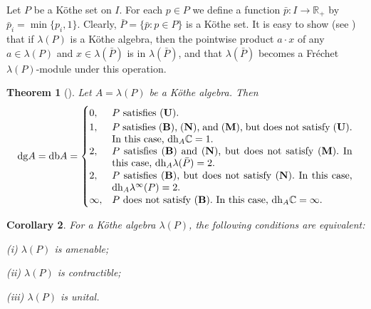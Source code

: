 \documentclass[12pt,reqno]{amsart}
\newtheorem{theorem}{Theorem}[section]
\newtheorem{corollary}[theorem]{Corollary}
\theoremstyle{definition}
\begin{document}
Let $P$ be a K\"othe set on $I$. For each $p\in P$ we define a function
$\bar p\colon I\to{\mathbb R}_+$
by $\bar p_i=\min\{ p_i,1\}$. Clearly, $\bar P=\{ \bar p : p\in P\}$ is a K\"othe set.
It is easy to show (see \cite[3.2]{Pir_QJM}) that if $\lambda(P)$ is a K\"othe
algebra, then the pointwise product $a\cdot x$ of any $a\in\lambda(P)$
and $x\in\lambda(\bar P)$ is in $\lambda(\bar P)$, and that
$\lambda(\bar P)$ becomes a Fr\'echet $\lambda(P)$-module under this operation.

\begin{theorem}[{\cite[4.3]{Pir_QJM}}]
\label{thm:dgdb}
Let $A=\lambda(P)$ be a K\"othe algebra. Then
\begin{equation*}
{\mathop{\mathrm{dg}}} A={\mathop{\mathrm{db}}} A=
\begin{cases}
0, & \text{$P$ satisfies {\upshape ({\textbf{U}})}}.\\
1, & \parbox[t]{85mm}{$P$ satisfies {\upshape ({\textbf{B}})}, {\upshape ({\textbf{N}})},
and {\upshape ({\textbf{M}})}, but does not satisfy {\upshape ({\textbf{U}})}. In this case, ${\mathop{\mathrm{dh}}}_A{\mathbb C}=1.$}\\
2, & \parbox[t]{85mm}{$P$ satisfies {\upshape ({\textbf{B}})} and {\upshape ({\textbf{N}})},
but does not satisfy {\upshape ({\textbf{M}})}. In this case, ${\mathop{\mathrm{dh}}}_A\lambda(\bar P)=2$.}\\
2, & \parbox[t]{85mm}{$P$ satisfies {\upshape ({\textbf{B}})},
but does not satisfy {\upshape ({\textbf{N}})}. In this case, ${\mathop{\mathrm{dh}}}_A\lambda^\infty(P)=2$.}\\
\infty, & \parbox[t]{85mm}{$P$ does not satisfy {\upshape ({\textbf{B}})}. In this case,
${\mathop{\mathrm{dh}}}_A{\mathbb C}=\infty$.}
\end{cases}
\end{equation*}
\end{theorem}

\begin{corollary}
\label{cor:unital}
For a K\"othe algebra $\lambda(P)$, the following conditions are equivalent:
\begin{compactenum}
\item[{\upshape (i)}] $\lambda(P)$ is amenable;
\item[{\upshape (ii)}] $\lambda(P)$ is contractible;
\item[{\upshape (iii)}] $\lambda(P)$ is unital.
\end{compactenum}
\end{corollary}
\end{document}
